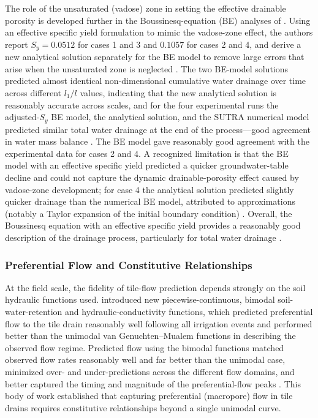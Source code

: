 \documentclass[11pt]{article}
\begin{document}
The role of the unsaturated (vadose) zone in setting the effective drainable porosity is
developed further in the Boussinesq-equation (BE) analyses of \textcite{Xin2016c}. Using
an effective specific yield formulation to mimic the vadose-zone effect, the authors
report $S_y = 0.0512$ for cases 1 and 3 and $0.1057$ for cases 2 and 4, and derive a new
analytical solution separately for the BE model to remove large errors that arise when the
unsaturated zone is neglected \parencite{Xin2016c}. The two BE-model solutions predicted
almost identical non-dimensional cumulative water drainage over time across different
$l_1/l$ values, indicating that the new analytical solution is reasonably accurate across
scales, and for the four experimental runs the adjusted-$S_y$ BE model, the analytical
solution, and the SUTRA numerical model predicted similar total water drainage at the end
of the process---good agreement in water mass balance \parencite{Xin2016c}. The BE model
gave reasonably good agreement with the experimental data for cases 2 and 4. A recognized
limitation is that the BE model with an effective specific yield predicted a quicker
groundwater-table decline and could not capture the dynamic drainable-porosity effect
caused by vadose-zone development; for case 4 the analytical solution predicted slightly
quicker drainage than the numerical BE model, attributed to approximations (notably a
Taylor expansion of the initial boundary condition) \parencite{Xin2016c}. Overall, the
Boussinesq equation with an effective specific yield provides a reasonably good
description of the drainage process, particularly for total water drainage
\parencite{Xin2016c}.

\subsubsection{Preferential Flow and Constitutive Relationships}

At the field scale, the fidelity of tile-flow prediction depends strongly on the soil
hydraulic functions used. \textcite{Mohanty1997} introduced new piecewise-continuous,
bimodal soil-water-retention and hydraulic-conductivity functions, which predicted
preferential flow to the tile drain reasonably well following all irrigation events and
performed better than the unimodal van Genuchten--Mualem functions in describing the
observed flow regime. Predicted flow using the bimodal functions matched observed flow
rates reasonably well and far better than the unimodal case, minimized over- and
under-predictions across the different flow domains, and better captured the timing and
magnitude of the preferential-flow peaks \parencite{Mohanty1997}. This body of work
established that capturing preferential (macropore) flow in tile drains requires
constitutive relationships beyond a single unimodal curve.
\end{document}
